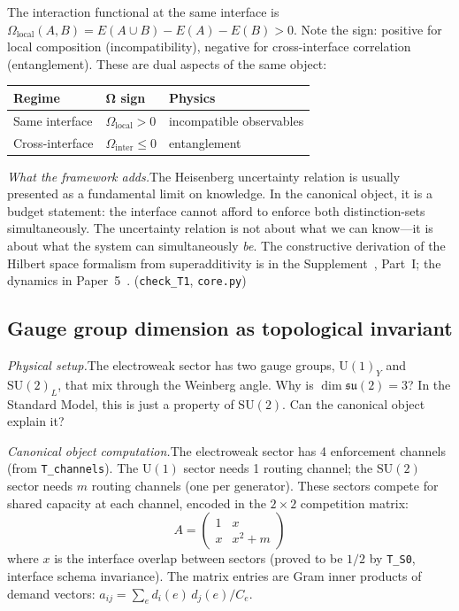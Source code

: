 \documentclass[11pt]{article}
\newcommand{\SU}{\mathrm{SU}}
\newcommand{\U}{\mathrm{U}}
\begin{document}
The interaction functional at the same interface is $\Omega_{\mathrm{local}}(A,B) = E(A \cup B) - E(A) - E(B) > 0$.  Note the sign: positive for local composition (incompatibility), negative for cross-interface correlation (entanglement).  These are dual aspects of the same object:

\smallskip
\begin{center}
\small
\begin{tabular}{lll}
\toprule
\textbf{Regime} & $\boldsymbol{\Omega}$ \textbf{sign} & \textbf{Physics} \\
\midrule
Same interface & $\Omega_{\mathrm{local}} > 0$ & incompatible observables \\
Cross-interface & $\Omega_{\mathrm{inter}} \le 0$ & entanglement \\
\bottomrule
\end{tabular}
\end{center}
\smallskip

\textit{What the framework adds.}\quad The Heisenberg uncertainty relation is usually presented as a fundamental limit on knowledge.  In the canonical object, it is a budget statement: the interface cannot afford to enforce both distinction-sets simultaneously.  The uncertainty relation is not about what we can know---it is about what the system can simultaneously \emph{be}.  The constructive derivation of the Hilbert space formalism from superadditivity is in the Supplement~\cite{Supp}, Part~I; the dynamics in Paper~5~\cite{P5}.  (\texttt{check\_T1}, \texttt{core.py})


\subsection{Gauge group dimension as topological invariant}

\textit{Physical setup.}\quad The electroweak sector has two gauge groups, $\U(1)_Y$ and $\SU(2)_L$, that mix through the Weinberg angle.  Why is $\dim\mathfrak{su}(2) = 3$?  In the Standard Model, this is just a property of $\SU(2)$.  Can the canonical object explain it?

\textit{Canonical object computation.}\quad The electroweak sector has 4 enforcement channels (from \texttt{T\_channels}).  The $\U(1)$ sector needs 1 routing channel; the $\SU(2)$ sector needs $m$ routing channels (one per generator).  These sectors compete for shared capacity at each channel, encoded in the $2\times 2$ competition matrix:
\begin{equation}
A = \begin{pmatrix} 1 & x \\ x & x^2 + m \end{pmatrix}
\end{equation}
where $x$ is the interface overlap between sectors (proved to be $1/2$ by \texttt{T\_S0}, interface schema invariance).  The matrix entries are Gram inner products of demand vectors: $a_{ij} = \sum_e d_i(e)\, d_j(e)/C_e$.
\end{document}
